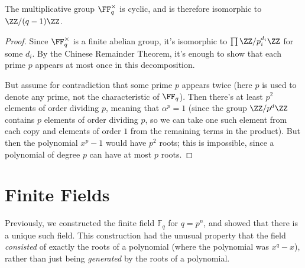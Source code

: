 \begin{proposition}
The multiplicative group $\FF_q^\times$ is cyclic, and is therefore isomorphic to $\ZZ/(q - 1)\ZZ$. 
\end{proposition}

\begin{proof}
Since $\FF_q^\times$ is a finite abelian group, it's isomorphic to $\prod \ZZ/p_i^{d_i}\ZZ$ for some $d_i$. By the Chinese Remainder Theorem, it's enough to show that each prime $p$ appears at most once in this decomposition. 

But assume for contradiction that some prime $p$ appears twice (here $p$ is used to denote any prime, not the characteristic of $\FF_q$). Then there's at least $p^2$ elements of order dividing $p$, meaning that $\alpha^p = 1$ (since the group $\ZZ/p^d\ZZ$ contains $p$ elements of order dividing $p$, so we can take one such element from each copy and elements of order $1$ from the remaining terms in the product). But then the polynomial $x^p - 1$ would have $p^2$ roots; this is impossible, since a polynomial of degree $p$ can have at most $p$ roots.  
\end{proof}





\section{Finite Fields}

Previously, we constructed the finite field $\mathbb{F}_q$ for $q = p^n$, and showed that there is a unique such field. This construction had the unusual property that the field \emph{consisted} of exactly the roots of a polynomial (where the polynomial was $x^q - x$), rather than just being \emph{generated} by the roots of a polynomial. 


